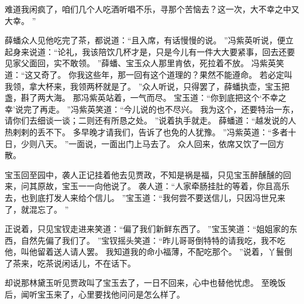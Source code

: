 难道我闲疯了，咱们几个人吃酒听唱不乐，寻那个苦恼去？这一次，大不幸之中又大幸。
”\par
薛蟠众人见他吃完了茶，都说道：“且入席，有话慢慢的说。
”冯紫英听说，便立起身来说道：“论礼，我该陪饮几杯才是，只是今儿有一件大大要紧事，回去还要见家父面回，实不敢领。
”薛蟠、宝玉众人那里肯依，死拉着不放。
冯紫英笑道：“这又奇了。
你我这些年，那一回有这个道理的？果然不能遵命。
若必定叫我领，拿大杯来，我领两杯就是了。
”众人听说，只得罢了，薛蟠执壶，宝玉把盏，斟了两大海。
那冯紫英站着，一气而尽。
宝玉道：“你到底把这个‘不幸之幸’说完了再走。
”冯紫英笑道：“今儿说的也不尽兴。
我为这个，还要特治一东，请你们去细谈一谈；二则还有所恳之处。
”说着执手就走。
薛蟠道：“越发说的人热剌剌的丢不下。
多早晚才请我们，告诉了也免的人犹豫。
”冯紫英道：“多者十日，少则八天。
”一面说，一面出门上马去了。
众人回来，依席又饮了一回方散。
\par
宝玉回至园中，袭人正记挂着他去见贾政，不知是祸是福，只见宝玉醉醺醺的回来，问其原故，宝玉一一向他说了。
袭人道：“人家牵肠挂肚的等着，你且高乐去，也到底打发人来给个信儿。
”宝玉道：“我何尝不要送信儿，只因冯世兄来了，就混忘了。
”\par
正说着，只见宝钗走进来笑道：“偏了我们新鲜东西了。
”宝玉笑道：“姐姐家的东西，自然先偏了我们了。
”宝钗摇头笑道：“昨儿哥哥倒特特的请我吃，我不吃他，叫他留着送人请人罢。
我知道我的命小福薄，不配吃那个。
”说着，丫鬟倒了茶来，吃茶说闲话儿，不在话下。
\par
却说那林黛玉听见贾政叫了宝玉去了，一日不回来，心中也替他忧虑。
至晚饭后，闻听宝玉来了，心里要找他问问是怎么样了。
